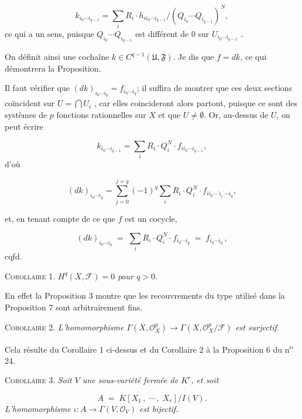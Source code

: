 \begin{equation*}
k_{i_0 \cdots i_{q-1}} = \sum_i R_i \cdot h_{i i_0 \cdots i_{q-1}}/(Q_{i_0} \cdots Q_{i_{q-1}})^N,
\end{equation*}
ce qui a un sens, puisque $Q_{i_0} \cdots Q_{i_{q-1}}$ est différent de 0 sur $U_{i_0 \cdots i_{q-1}}$ .

On définit ainsi une cochaîne $k \in C^{q-1}(\mathfrak{U}, \mathfrak{F})$. Je dis que $f = dk$, ce qui démontrera la Proposition.

Il faut vérifier que $(dk)_{i_0 \cdots i_q} = f_{i_0 \cdots i_q}$; il suffira de montrer que ces deux sections coïncident sur $U = \bigcap U_i$ , car elles coincideront alors partout, puisque ce sont des systèmes de $p$ fonctions rationnelles sur $X$ et que $U \neq \emptyset$. Or, au-dessus de $U$, on peut écrire

\begin{equation*}
k_{i_0 \cdots i_{q-1}} = \sum_i R_i \cdot Q_i^N \cdot f_{i i_0 \cdots i_{q-1}} ,
\end{equation*}
d'où

\begin{equation*}
(dk)_{i_0 \cdots i_q} = \sum_{j=0}^{j=q} (-1)^q \sum_i R_i \cdot Q_i^N \cdot f_{i i_0 \cdots \hat{\imath}_j \cdots i_q} , 
\end{equation*}


 et, en tenant compte de ce que $f$ est un cocycle,

\begin{equation*}
(dk)_{i_0\cdots i_q} \;=\; \sum_i R_i \cdot Q_i^N \cdot f_{i_0\cdots i_q} \;=\; f_{i_0\cdots i_q} \, ,
\end{equation*}
\hfill cqfd.

\textsc{Corollaire} 1. \textit{$H^q(X, \mathcal{F}) = 0$ pour $q > 0$.}

En effet la Proposition 3 montre que les recouvrements du type utilisé dans la Proposition 7 sont arbitrairement fins.

\textsc{Corollaire} 2. \textit{L'homomorphisme $\Gamma(X, \mathcal{O}_X^p) \to \Gamma(X, \mathcal{O}_X^p/\mathcal{F})$ est surjectif.}

Cela résulte du Corollaire 1 ci-dessus et du Corollaire 2 à la Proposition 6 du n\textsuperscript{o} 24.

\textsc{Corollaire} 3. \textit{Soit $V$ une sous-variété fermée de $K^r$, et soit}

\begin{equation*}
A \;=\; K[X_1 \, , \; \cdots \, , \; X_r]/I(V).
\end{equation*}
\textit{L'homomorphisme $\iota : A \to \Gamma(V, \mathcal{O}_V)$ est bijectif.}

